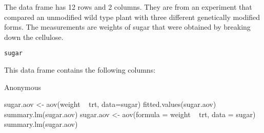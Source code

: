 \begin{Description}\relax
The  data frame has 12 rows and 2 columns.
They are from an experiment that
compared an unmodified wild type plant with three different
genetically modified forms.  The measurements are
weights  of sugar that were obtained by breaking down the
cellulose.
\end{Description}
\begin{Usage}
\begin{verbatim}sugar\end{verbatim}
\end{Usage}
\begin{Format}\relax
This data frame contains the following columns:
\end{Format}
\begin{Source}\relax
Anonymous
\end{Source}
\begin{Examples}
\begin{ExampleCode}
sugar.aov <- aov(weight ~ trt, data=sugar)
fitted.values(sugar.aov)
summary.lm(sugar.aov)
sugar.aov <- aov(formula = weight ~ trt, data = sugar)
summary.lm(sugar.aov)
\end{ExampleCode}
\end{Examples}

